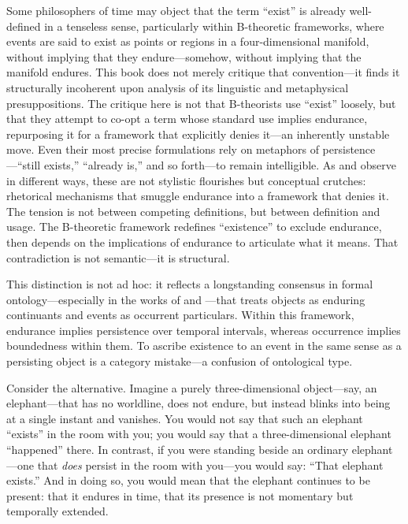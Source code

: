 \documentclass[12pt]{book}
\begin{document}
Some philosophers of time may object that the term ``exist'' is already well-defined in a tenseless sense, particularly within B-theoretic frameworks, where events are said to exist as points or regions in a four-dimensional manifold, without implying that they endure---somehow, without implying that the manifold endures. This book does not merely critique that convention---it finds it structurally incoherent upon analysis of its linguistic and metaphysical presuppositions. The critique here is not that B-theorists use ``exist'' loosely, but that they attempt to co-opt a term whose standard use implies endurance, repurposing it for a framework that explicitly denies it---an inherently unstable move. Even their most precise formulations rely on metaphors of persistence---``still exists,'' ``already is,'' and so forth---to remain intelligible. As \citet{markosian2004} and \citet{fine2005} observe in different ways, these are not stylistic flourishes but conceptual crutches: rhetorical mechanisms that smuggle endurance into a framework that denies it. The tension is not between competing definitions, but between definition and usage. The B-theoretic framework redefines ``existence'' to exclude endurance, then depends on the implications of endurance to articulate what it means. That contradiction is not semantic---it is structural.

This distinction is not ad hoc: it reflects a longstanding consensus in formal ontology---especially in the works of \citet{simons1987} and \citet{lowe2006}---that treats objects as enduring continuants and events as occurrent particulars. Within this framework, endurance implies persistence over temporal intervals, whereas occurrence implies boundedness within them. To ascribe existence to an event in the same sense as a persisting object is a category mistake---a confusion of ontological type.

Consider the alternative. Imagine a purely three-dimensional object---say, an elephant---that has no worldline, does not endure, but instead blinks into being at a single instant and vanishes. You would not say that such an elephant ``exists'' in the room with you; you would say that a three-dimensional elephant ``happened'' there. In contrast, if you were standing beside an ordinary elephant---one that \textit{does} persist in the room with you---you would say: ``That elephant exists.'' And in doing so, you would mean that the elephant continues to be present: that it endures in time, that its presence is not momentary but temporally extended.
\end{document}
